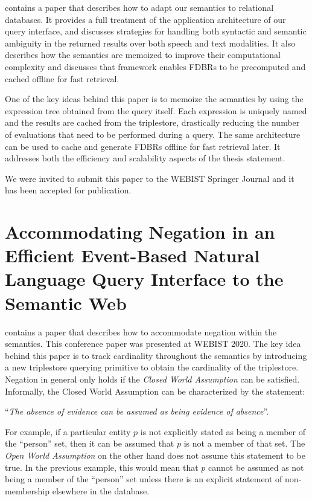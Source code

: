\documentclass[../main.tex]{subfiles}
\begin{document}
\begin{refsection}
\textbf{} contains a paper that describes how to adapt our semantics
to relational databases.  It provides a full treatment of the application architecture of our query interface, and discusses strategies for handling both syntactic and semantic ambiguity in the returned results over both speech and text modalities.  It also describes how the semantics are memoized to improve their computational complexity and discusses that framework enables FDBRs to be precomputed and cached offline for fast retrieval.

One of the key ideas behind this paper is to memoize the semantics by using the expression tree obtained from the query itself.  Each expression is uniquely named and the results are cached from the triplestore, drastically reducing the number of evaluations that need to be performed during a query.  The same architecture can be used to cache and generate FDBRs offline for fast retrieval later.  It addresses both the efficiency and scalability aspects of the thesis statement.

We were invited to submit this paper to the WEBIST Springer Journal and it has been accepted for publication.

\section{Accommodating Negation in an Efficient Event-Based Natural Language Query Interface to the Semantic Web}

\textbf{} contains a paper that describes how to accommodate negation
within the semantics.  This conference paper was presented at WEBIST 2020.
The key idea behind this paper is to track cardinality throughout the semantics by introducing
a new triplestore querying primitive to obtain the cardinality of the triplestore.  Negation
in general only holds if the \textit{Closed World Assumption} can be satisfied.  Informally, the Closed World Assumption can be characterized by the statement:

{\hfil ``\textit{The absence of evidence can be assumed as being evidence of absence}''. \hfil}

For example, if a particular entity $p$ is not explicitly stated as being a member of the ``person'' set, then it can be assumed that $p$ is not a member of that set.  The \textit{Open World Assumption} on the other hand does not assume this statement to be true.  In the previous example, this would mean that $p$ cannot be assumed as not being a member of the ``person'' set unless there is an explicit statement of non-membership elsewhere in the database.


\end{refsection}
\end{document}
